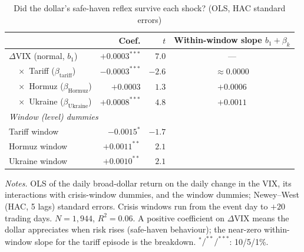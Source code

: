 \begin{table}[htbp]
\centering
\begin{threeparttable}
\caption{Did the dollar's safe-haven reflex survive each shock? (OLS, HAC standard errors)}
\label{tab:safehaven_reg}
\small
\begin{tabular}{l rr c}
\toprule
 & Coef. & $t$ & Within-window slope $b_1+\beta_k$ \\
\midrule
$\Delta$VIX \;(normal, $b_1$)                 & $+0.0003^{***}$ & $7.0$  & --- \\
\addlinespace
$\quad\times$ Tariff \;($\beta_{\text{tariff}}$)   & $-0.0003^{***}$ & $-2.6$ & $\approx 0.0000$ \\
$\quad\times$ Hormuz \;($\beta_{\text{Hormuz}}$)   & $+0.0003$       & $1.3$  & $+0.0006$ \\
$\quad\times$ Ukraine \;($\beta_{\text{Ukraine}}$) & $+0.0008^{***}$ & $4.8$  & $+0.0011$ \\
\midrule
\multicolumn{4}{l}{\emph{Window (level) dummies}}\\
\quad Tariff window   & $-0.0015^{*}$  & $-1.7$ & \\
\quad Hormuz window   & $+0.0011^{**}$ & $2.1$  & \\
\quad Ukraine window  & $+0.0010^{**}$ & $2.1$  & \\
\bottomrule
\end{tabular}
\begin{tablenotes}[flushleft]\footnotesize
\item \textit{Notes.} OLS of the daily broad-dollar return on the daily change in the VIX,
its interactions with crisis-window dummies, and the window dummies; Newey--West (HAC, 5
lags) standard errors. Crisis windows run from the event day to $+20$ trading days.
$N=1{,}944$, $R^2=0.06$. A positive coefficient on $\Delta$VIX means the dollar appreciates
when risk rises (safe-haven behaviour); the near-zero within-window slope for the tariff
episode is the breakdown. $^{*}/^{**}/^{***}$: 10/5/1\%.
\end{tablenotes}
\end{threeparttable}
\end{table}
